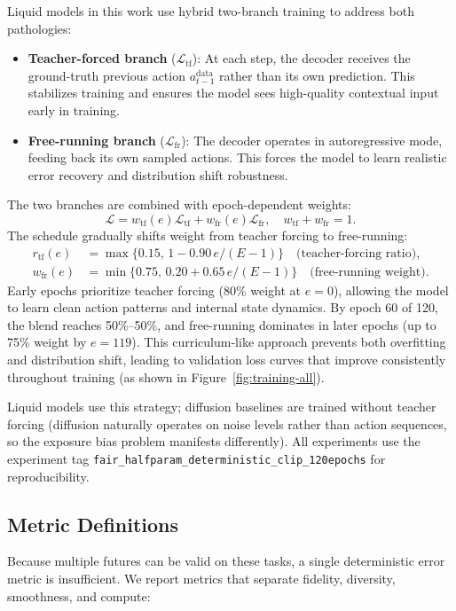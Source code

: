 \documentclass{article}
\begin{document}
Liquid models in this work use hybrid two-branch training to address both pathologies:
\begin{itemize}
    \item \textbf{Teacher-forced branch} ($\mathcal{L}_{\mathrm{tf}}$): At each step, the decoder receives the ground-truth previous action $a_{t-1}^{\mathrm{data}}$ rather than its own prediction. This stabilizes training and ensures the model sees high-quality contextual input early in training.
    \item \textbf{Free-running branch} ($\mathcal{L}_{\mathrm{fr}}$): The decoder operates in autoregressive mode, feeding back its own sampled actions. This forces the model to learn realistic error recovery and distribution shift robustness.
\end{itemize}
The two branches are combined with epoch-dependent weights:
\begin{equation}
\mathcal{L} = w_{\mathrm{tf}}(e) \mathcal{L}_{\mathrm{tf}} + w_{\mathrm{fr}}(e) \mathcal{L}_{\mathrm{fr}}, \quad w_{\mathrm{tf}} + w_{\mathrm{fr}} = 1.
\end{equation}
The schedule gradually shifts weight from teacher forcing to free-running:
\begin{align}
r_{\mathrm{tf}}(e) &= \max\{0.15,\, 1 - 0.90 \, e/(E-1)\} \quad \text{(teacher-forcing ratio)}, \\
w_{\mathrm{fr}}(e) &= \min\{0.75,\, 0.20 + 0.65 \, e/(E-1)\} \quad \text{(free-running weight)}.
\end{align}
Early epochs prioritize teacher forcing (80\% weight at $e=0$), allowing the model to learn clean action patterns and internal state dynamics. By epoch 60 of 120, the blend reaches 50\%--50\%, and free-running dominates in later epochs (up to 75\% weight by $e=119$). This curriculum-like approach prevents both overfitting and distribution shift, leading to validation loss curves that improve consistently throughout training (as shown in Figure~\ref{fig:training-all}).

Liquid models use this strategy; diffusion baselines are trained without teacher forcing (diffusion naturally operates on noise levels rather than action sequences, so the exposure bias problem manifests differently). All experiments use the experiment tag \texttt{fair\_halfparam\_deterministic\_clip\_120epochs} for reproducibility.

\subsection{Metric Definitions}
Because multiple futures can be valid on these tasks, a single deterministic error metric is insufficient. We report metrics that separate fidelity, diversity, smoothness, and compute:
\end{document}
